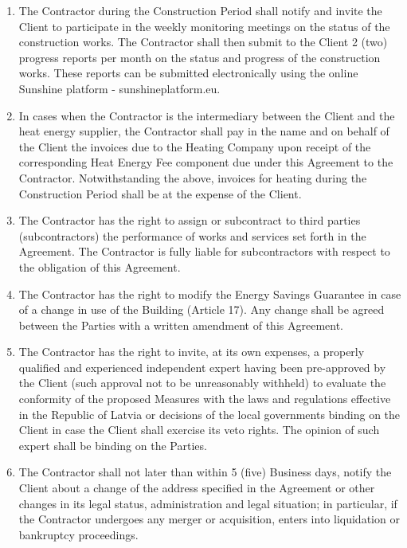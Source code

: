 \begin{multicols}{2}
\begin{enumerate}
	\item	The Contractor during the Construction Period shall notify and invite the Client to participate in the weekly monitoring meetings on the status of the construction works. The Contractor shall then submit to the Client 2 (two) progress reports per month on the status and progress of the construction works. These reports can be submitted electronically using the online Sunshine platform - sunshineplatform.eu.
	\item	In cases when the Contractor is the intermediary between the Client and the heat energy supplier, the Contractor shall pay in the name and on behalf of the Client the invoices due to the Heating Company upon receipt of the corresponding Heat Energy Fee component due under this Agreement to the Contractor. Notwithstanding the above, invoices for heating during the Construction Period shall be at the expense of the Client.
	\item	The Contractor has the right to assign or subcontract to third parties (subcontractors) the performance of works and services set forth in the Agreement. The Contractor is fully liable for subcontractors with respect to the obligation of this Agreement.
	\item	The Contractor has the right to modify the Energy Savings Guarantee in case of a change in use of the Building (Article 17). Any change shall be agreed between the Parties with a written amendment of this Agreement.
	\item	The Contractor has the right to invite, at its own expenses, a properly qualified and experienced independent expert having been pre-approved by the Client (such approval not to be unreasonably withheld) to evaluate the conformity of the proposed Measures with the laws and regulations effective in the Republic of Latvia or decisions of the local governments binding on the Client in case the Client shall exercise its veto rights. The opinion of such expert shall be binding on the Parties.
	\item	The Contractor shall not later than within 5 (five) Business days, notify the Client about a change of the address specified in the Agreement or other changes in its legal status, administration and legal situation; in particular, if the Contractor undergoes any merger or acquisition, enters into liquidation or bankruptcy proceedings.
\end{enumerate}


\end{multicols}
